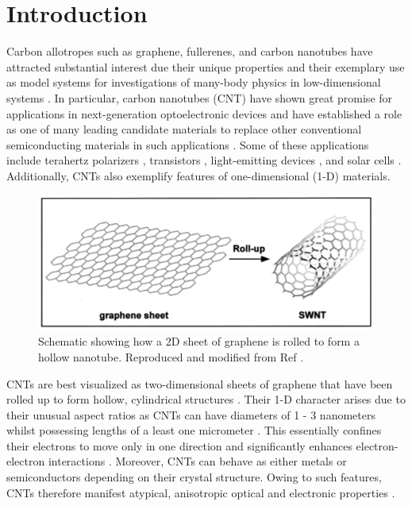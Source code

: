\chapter{Introduction}

Carbon allotropes such as graphene, fullerenes, and carbon nanotubes have attracted substantial interest due their unique properties and their exemplary use as model systems for investigations of many-body physics in low-dimensional systems \cite{zaytseva2016carbon, nanot2012optoelectronic, soavi2016ultrafast}. In particular, carbon nanotubes (CNT) have shown great promise for applications in next-generation optoelectronic devices and have established a role as one of many leading candidate materials to replace other conventional semiconducting materials in such applications \cite{nanot2012optoelectronic}. Some of these applications include terahertz polarizers \cite{ren2009carbon}, transistors \cite{qiu2017scaling}, light-emitting devices \cite{liu2015electrically}, and solar cells \cite{kongkanand2007single}. Additionally, CNTs also exemplify features of one-dimensional (1-D) materials.

\begin{figure}[H]
	\centering
	\includegraphics[scale=0.8]{images/chapter_intro/rolled_up_graphene.png}
	\caption{Schematic showing how a 2D sheet of graphene is rolled to form a hollow nanotube. Reproduced and modified from Ref \cite{odom2000structure}.}
\end{figure}

CNTs are best visualized as two-dimensional sheets of graphene that have been rolled up to form hollow, cylindrical structures \cite{odom2000structure,charlier2007electronic}. Their 1-D character arises due to their unusual aspect ratios as CNTs can have diameters of 1 - 3 nanometers whilst possessing lengths of a least one micrometer  \cite{zaytseva2016carbon, ando1997excitons}. This essentially confines their electrons to move only in one direction and significantly enhances electron-electron interactions \cite{ando1997excitons}. Moreover, CNTs can behave as either metals or semiconductors depending on their crystal structure. Owing to such features, CNTs therefore manifest atypical, anisotropic optical and electronic properties \cite{weismanKonoBook}.

